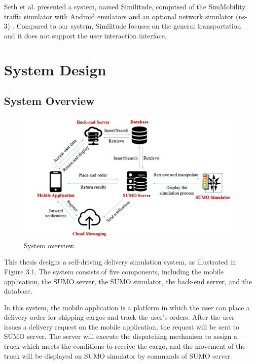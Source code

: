 \documentclass[12pt]{ksthesis}
\begin{document}
\begin{thesis}
{Seth et al. presented a system, named Similitude, comprised of the SimMobility traffic simulator with Android emulators and an optional network simulator (ns-3) \cite{Hetu2014}. Compared to our system, Similitude focuses on the general transportation and it does not support the user interaction interface.




\chapter{System Design}\label{Chap:System_design}


\section{System Overview}

\begin{figure}[H]
\centering
\includegraphics[width=1.0\textwidth]{./figures/F3-1_SystemOverview.PNG}
\caption{\large System overview.}
\vspace{0.5cm}
\label{Fig:system_Overview}
\end{figure}

This thesis designs a self-driving delivery simulation system, as illustrated in Figure 3.1. The system consists of five components, including the mobile application, the SUMO server, the SUMO simulator, the back-end server, and the database. 

In this system, the mobile application is a platform in which the user can place a delivery order for shipping cargos and track the user’s orders. After the user issues a delivery request on the mobile application, the request will be sent to SUMO server. The server will execute the dispatching mechanism to assign a truck which meets the conditions to receive the cargo, and the movement of the truck will be displayed on SUMO simulator by commands of SUMO server. 

}
\end{thesis}
\end{document}
